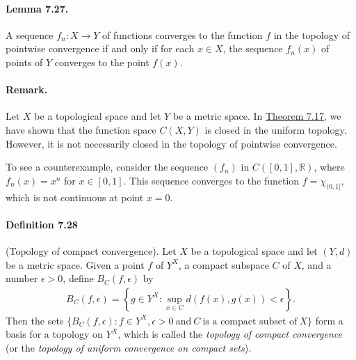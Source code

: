 \documentclass{article}
\numberwithin{equation}{section}
\theoremstyle{plain}
\theoremstyle{definition}
\begin{document}
\paragraph{Lemma 7.27.\label{lemma:7.27}} A sequence $f_n:X\to Y$ of functions converges to the function $f$ in the topology of pointwise convergence if and only if for each $x\in X$, the sequence $f_n(x)$ of points of $Y$ converges to the point $f(x)$.

\paragraph{Remark.} Let $X$ be a topological space and let $Y$ be a metric space. In \hyperref[thm:7.17]{Theorem 7.17}, we have shown that the function space $C(X,Y)$ is closed in the uniform topology. However, it is not necessarily closed in the topology of pointwise convergence.

To see a counterexample, consider the sequence $(f_n)$ in $C([0,1],\mathbb{R})$, where $f_n(x)=x^n$ for $x\in[0,1]$. This sequence converges to the function $f=\chi_{(0,1]}$, which is not continuous at point $x=0$.

\paragraph{Definition 7.28} (Topology of compact convergence). Let $X$ be a topological space and let $(Y,d)$ be a metric space. Given a point $f$ of $Y^X$, a compact subspace $C$ of $X$, and a number $\epsilon > 0$, define $B_C(f,\epsilon)$ by
\begin{align*}
	B_C(f,\epsilon) = \left\{g\in Y^X:\sup_{x\in C}d\left(f(x),g(x)\right)<\epsilon\right\}.
\end{align*}
Then the sets $\{B_C(f,\epsilon):f\in Y^X,\epsilon>0\ \text{and}\ C\ \text{is a compact subset of}\ X\}$ form a basis for a topology on $Y^X$, which is called the \textit{topology of compact convergence} (or the \textit{topology of uniform convergence on compact sets}).
\end{document}
